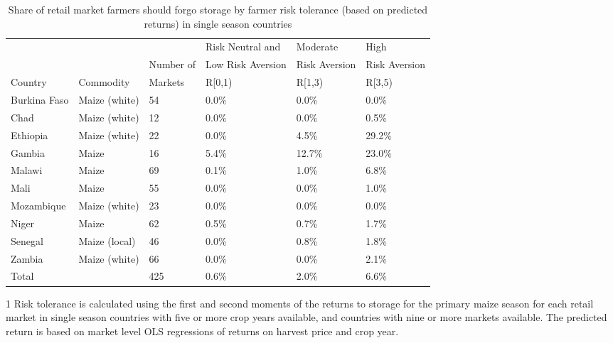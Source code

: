 \begin{table}[ht]
	\begin{threeparttable}[t]
		\centering
		\caption{Share of retail market farmers should forgo storage by farmer risk tolerance (based on predicted returns) in single season countries}
		\label{tab:risk_return_pred}
		\begin{tabular}{|lll|lll|}
			\hline 
			&  & & Risk Neutral and & Moderate & High \\ 
			& & Number of  & Low Risk Aversion & Risk Aversion &  Risk Aversion\\ 
			Country & Commodity& Markets& R\in[0,1) &  R\in[1,3) & R\in[3,5) \\
			\hline
Burkina Faso & Maize (white) & 54 & 0.0\% & 0.0\% & 0.0\% \\ 
  Chad & Maize (white) & 12 & 0.0\% & 0.0\% & 0.5\% \\ 
  Ethiopia & Maize (white) & 22 & 0.0\% & 4.5\% & 29.2\% \\ 
  Gambia & Maize & 16 & 5.4\% & 12.7\% & 23.0\% \\ 
  Malawi & Maize & 69 & 0.1\% & 1.0\% & 6.8\% \\ 
  Mali & Maize & 55 & 0.0\% & 0.0\% & 1.0\% \\ 
  Mozambique & Maize (white) & 23 & 0.0\% & 0.0\% & 0.0\% \\ 
  Niger & Maize & 62 & 0.5\% & 0.7\% & 1.7\% \\ 
  Senegal & Maize (local) & 46 & 0.0\% & 0.8\% & 1.8\% \\ 
  Zambia & Maize (white) & 66 & 0.0\% & 0.0\% & 2.1\% \\ 
  \hline
  Total &  & 425 & 0.6\% & 2.0\% & 6.6\% \\ 
  \hline
\hline 
\end{tabular}
\begin{tablenotes}
\item [1] \footnotesize Risk tolerance is calculated using the first and second moments of the returns to storage for the primary maize season for each retail market in single season countries with five or more crop years available, and countries with nine or more markets available. The predicted return is based on market level OLS regressions of returns on harvest price and crop year.
\end{tablenotes}
\end{threeparttable}
\end{table}
